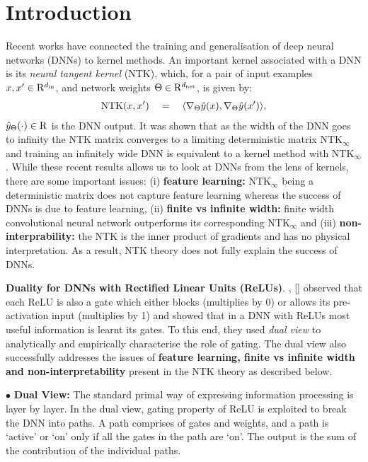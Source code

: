 \section{Introduction}
Recent works have connected the training and generalisation of deep neural networks (DNNs) to kernel methods. An important kernel associated with a DNN is its \emph{neural tangent kernel} (NTK), which, for a pair of input examples $x,x'\in\mathrm{R}^{d_{\text{in}}}$, and network weights $\Theta\in\mathrm{R}^{d_{\text{net}}}$, is given by:
\begin{align*}
 \text{NTK}(x,x')\quad = \quad \langle \nabla_{\Theta}\hat{y}(x), \nabla_{\Theta}\hat{y}(x')\rangle, 
\end{align*}
$\hat{y}_\Theta(\cdot)\in\mathrm{R}$ is the DNN output. It was shown that as the width of the DNN goes to infinity the NTK matrix converges to a limiting deterministic matrix $\text{NTK}_{\infty}$ and training an infinitely wide DNN is equivalent to a kernel method with $\text{NTK}_{\infty}$. While these recent results allows us to look at DNNs from the lens of kernels, there are some important issues: (i) \textbf{feature learning:} $\text{NTK}_{\infty}$ being a deterministic matrix does not capture feature learning whereas the success of DNNs is due to feature learning, (ii) \textbf{finite vs infinite width:} finite width convolutional neural network outperforms its corresponding $\text{NTK}_{\infty}$ and (iii)  \textbf{non-interprability:} the NTK is the inner product of gradients and has no physical interpretation. As a result, NTK theory does not fully explain the success of DNNs.

\textbf{Duality for DNNs with Rectified Linear Units (ReLUs)}.  \cite{npk}, [] observed that each ReLU is also a gate which either blocks (multiplies by 0) or allows its pre-activation input (multiplies by 1) and showed that in a DNN with ReLUs most useful information is learnt its gates. To this end, they used \emph{dual view} to analytically and empirically characterise the role of gating. The dual view also successfully addresses the issues of \textbf{feature learning, finite vs infinite width and non-interpretability} present in the NTK theory as described below.

$\bullet$ \textbf{Dual View:}  The standard primal way of expressing information processing is layer by layer.  In the dual view, gating property of ReLU is exploited to break the DNN into paths. A path comprises of gates and weights, and a path is `active' or `on' only if all the gates in the path are `on'. The output is the sum of the contribution of the individual paths. 

